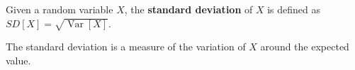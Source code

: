\documentclass{article}
\DeclareMathOperator{\Var}{Var}
\begin{document}
Given a random variable $X$, the \textbf{standard deviation} of $X$ is defined as\\
$SD[X] = \sqrt{\Var[X]}$.\\
\par
The standard deviation is a measure of the variation of $X$ around the expected value.
\end{document}
